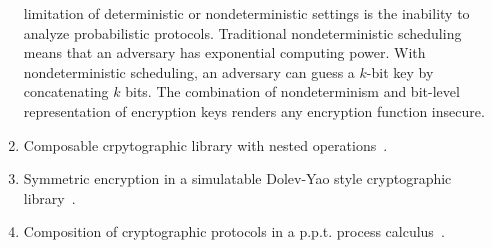 \begin{enumerate}[leftmargin=*]
    limitation of deterministic or nondeterministic settings is the inability to
    analyze probabilistic protocols. Traditional nondeterministic scheduling
    means that an adversary has exponential computing power. With
    nondeterministic scheduling, an adversary can guess a $k$-bit key by
    concatenating $k$ bits. The combination of nondeterminism and bit-level
    representation of encryption keys renders any encryption function insecure.
  \item Composable crpytographic library with nested
    operations~\cite{backes2003composable}.
  \item Symmetric encryption in a simulatable Dolev-Yao style cryptographic
    library~\cite{backes2004symmetric}.
  \item Composition of cryptographic protocols in a p.p.t. process
    calculus~\cite{mateus2003composition}.
\end{enumerate}
